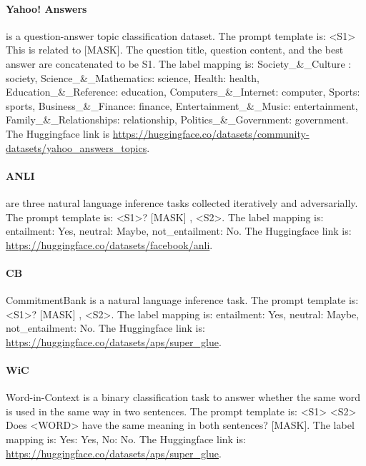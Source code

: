 \paragraph{Yahoo! Answers} \citep{zhang2015character} is a question-answer topic classification dataset. The prompt template is: \textless{}S1\textgreater{} This is related to {[}MASK{]}. The question title, question content, and the best answer are concatenated to be S1. The label mapping is: Society\_\&\_Culture : society, Science\_\&\_Mathematics: science, Health: health, Education\_\&\_Reference: education, Computers\_\&\_Internet: computer, Sports: sports, Business\_\&\_Finance: finance, Entertainment\_\&\_Music: entertainment, Family\_\&\_Relationships: relationship, Politics\_\&\_Government: government. The Huggingface link is \url{https://huggingface.co/datasets/community-datasets/yahoo_answers_topics}.

\paragraph{ANLI} \citep{nie2019adversarial} are three natural language inference tasks collected iteratively and adversarially. The prompt template is: \textless{}S1\textgreater{}? {[}MASK{]} , \textless{}S2\textgreater{}. The label mapping is: entailment: Yes, neutral: Maybe, not\_entailment: No. The Huggingface link is: \url{https://huggingface.co/datasets/facebook/anli}.

\paragraph{CB} CommitmentBank \citep{de2019commitmentbank} is a natural language inference task. The prompt template is: \textless{}S1\textgreater{}? {[}MASK{]} , \textless{}S2\textgreater{}. The label mapping is: entailment: Yes, neutral: Maybe, not\_entailment: No. The Huggingface link is: \url{https://huggingface.co/datasets/aps/super_glue}.

\paragraph{WiC} Word-in-Context \citep{pilehvar2018wic} is a binary classification task to answer whether the same word is used in the same way in two sentences. The prompt template is: \textless{}S1\textgreater{} \textless{}S2\textgreater{} Does \textless{}WORD\textgreater{} have the same meaning in both sentences? {[}MASK{]}. The label mapping is: Yes: Yes, No: No. The Huggingface link is: \url{https://huggingface.co/datasets/aps/super_glue}.

